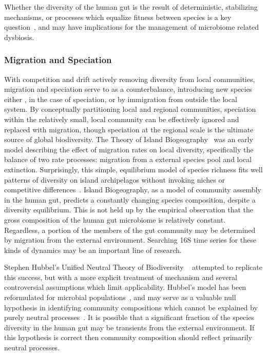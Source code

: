 \documentclass[12pt]{article}
\begin{document}
Whether the diversity of the human gut is the result of
deterministic, stabilizing mechanisms, or processes which equalize
fitness between species is a key question~\citep{Adler2007},
and may have implications for the management of microbiome related
dysbiosis.

\subsubsection{Migration and Speciation}
With competition and drift actively removing diversity from local
communities, migration and speciation serve to as a counterbalance,
introducing new species either ,
in the case of speciation, or by immigration from outside the
local system.
By conceptually partitioning local and regional communities,
speciation within the relatively small, local community can be effectively
ignored and replaced with migration,
though speciation at the regional scale is the ultimate source of global
biodiversity.
The Theory of Island Biogeography~\citep{macarthur1967b} was
an early model describing the effect of migration rates on local diversity,
specifically the balance of two rate processes:
migration from a external species pool and local extinction.
Surprisingly, this simple, equilibrium model of species richness
fits well patterns of diversity on island archipelagos
without invoking niches or competitive differences~\citep{Simberloff1976}.
Island Biogeography, as a model of community assembly in the human gut,
predicts a constantly changing species composition,
despite a diversity equilibrium.
This is not held up by the empirical observation that the gross composition of
the human gut microbiome is relatively constant.
Regardless, a portion of the members of the gut community may be determined
by migration from the external environment.
Searching 16S time series for these kinds of dynamics may be an important
line of research.

Stephen Hubbel's Unified Neutral Theory of Biodiversity%
~\citeyearpar{Hubbell2001}
attempted to replicate this success,
but with a more explicit treatment of mechanism
and several controversial assumptions which limit applicability.
Hubbel's model has been
reformulated for microbial populations~\citep{Sloan2005},
and may serve as a valuable null hypothesis in identifying community
compositions which cannot be explained
by purely neutral processes~\cite{VenkataramenTODO}.
It is possible that
a significant fraction of the species diversity in the human gut may be
transients from the external environment.
If this hypothesis is correct then community composition should reflect
primarily neutral processes.
\end{document}
